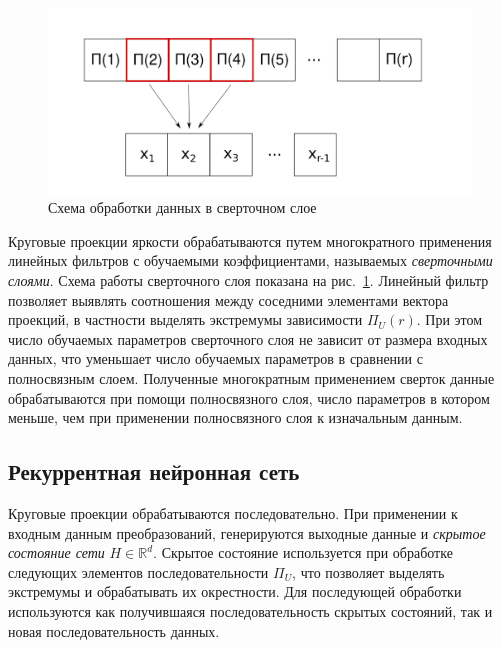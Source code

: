 \documentclass[12pt, twoside]{article}
\begin{document}
\begin{figure}[!htbp]
\begin{center}
\includegraphics[scale=0.4]{fig/conv.pdf}
\end{center}
\caption{Схема обработки данных в сверточном слое}
\label{fig:conv}
\end{figure}
Круговые проекции яркости обрабатываются путем многократного применения линейных фильтров с обучаемыми коэффициентами, называемых \emph{сверточными слоями}. Схема работы сверточного слоя показана на рис.~\ref{fig:conv}. Линейный фильтр позволяет выявлять соотношения между соседними элементами вектора проекций, в частности выделять экстремумы зависимости $\Pi_U(r)$. При этом число обучаемых параметров сверточного слоя не зависит от размера входных данных, что уменьшает число обучаемых параметров в сравнении с полносвязным слоем. Полученные многократным применением сверток данные обрабатываются при помощи полносвязного слоя, число параметров в котором меньше, чем при применении полносвязного слоя к изначальным данным.

\subsection{Рекуррентная нейронная сеть}

Круговые проекции обрабатываются последовательно. При применении к входным данным преобразований, генерируются выходные данные и \emph{скрытое состояние сети} $H \in \mathbb{R}^d$. Скрытое состояние используется при обработке следующих элементов последовательности $\Pi_U$, что позволяет выделять экстремумы и обрабатывать их окрестности. Для последующей обработки используются как получившаяся последовательность скрытых состояний, так и новая последовательность данных.
\end{document}
